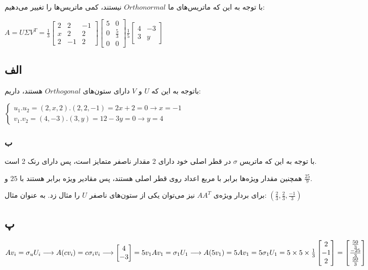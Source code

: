 با توجه به این که ماتریس‌های ما $Orthonormal$ نیستند، کمی ماتریس‌ها را تغییر می‌دهیم:

\setLTR
$
A = U \Sigma V^T
= \frac{1}{3} 
\begin{bmatrix}
2 & 2 & -1 \\	
x & 2 & 2 \\
2 & -1 & 2
\end{bmatrix}
\begin{bmatrix}
5 & 0\\
0 & \frac{5}{3} \\
0 & 0
\end{bmatrix}
\frac{1}{5}
\begin{bmatrix}
4 & -3 \\
3 & y
\end{bmatrix}
$
\setRTL

\subsection*{الف}

باتوجه به این که $U$ و $V$ دارای ستون‌های $Orthogonal$ هستند، داریم:

\setLTR
$
\begin{cases}
u_1.u_2=(2,x,2).(2,2,-1) = 2x+2 = 0 \longrightarrow x=-1 \\
v_1.v_2 = (4,-3).(3,y) = 12 - 3y = 0 \longrightarrow y =4 
\end{cases}
$
\setRTL

\subsubsection*{ب}

با توجه به این که ماتریس $\sigma$ در قطر اصلی خود دارای 2 مقدار ناصفر متمایز است، پس دارای رنک 2 است. 

همچنین مقدار ویژه‌ها برابر با مربع اعداد روی قطر اصلی هستند، پس مقادیر ویژه برابر هستند با $25$ و $\frac{25}{9}$.

برای بردار ویژه‌ی $AA^T$ نیز می‌توان یکی از ستون‌های ناصفر $U$ را مثال زد. به عنوان مثال: 
$(\frac{2}{3},\frac{2}{3},\frac{-1}{3})$

\subsection*{پ}

\setLTR
$
Av_i=\sigma_uU_i \longrightarrow A(cv_i) = c\sigma_iv_i \longrightarrow 
\begin{bmatrix}
	4 \\
	-3
\end{bmatrix} = 5v_1
\\
Av_1=\sigma_1U_1\longrightarrow A(5v_1)=5Av_1=5\sigma_1U_1 = 5\times5\times\frac{1}{3}\begin{bmatrix}
2 \\
-1 \\
2
\end{bmatrix} = \begin{bmatrix}
\frac{50}{3} \\
\frac{-25}{3} \\
\frac{50}{3	}
\end{bmatrix}
$

